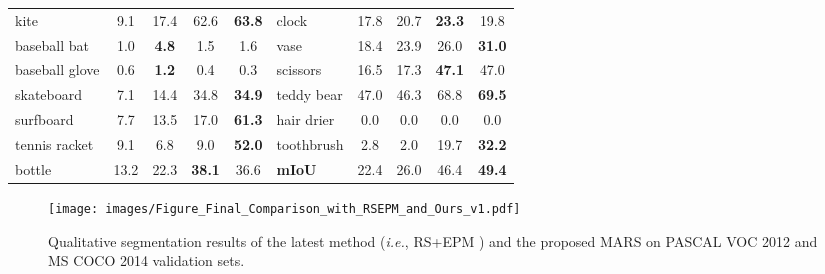 \documentclass[10pt,twocolumn,letterpaper]{article}
\begin{document}
\begin{table*}[t]
\begin{scriptsize}
\begin{tabular}{
    p{} c c c c | p{} c c c c}
    kite & 9.1 & 17.4 & 62.6 & \textbf{63.8} & clock & 17.8 & 20.7 & \textbf{23.3} & 19.8 \\
    baseball bat & 1.0 & \textbf{4.8} & 1.5 & 1.6 & vase & 18.4 & 23.9 & 26.0 & \textbf{31.0} \\
    baseball glove & 0.6 & \textbf{1.2} & 0.4 & 0.3 & scissors & 16.5 & 17.3 & \textbf{47.1} & 47.0 \\
    skateboard & 7.1 & 14.4 & 34.8 & \textbf{34.9} & teddy bear & 47.0 & 46.3 & 68.8 & \textbf{69.5} \\
    surfboard & 7.7 & 13.5 & 17.0 & \textbf{61.3} & hair drier & 0.0 & 0.0 & 0.0 & 0.0 \\
    tennis racket & 9.1 & 6.8 & 9.0 & \textbf{52.0} & toothbrush & 2.8 & 2.0 & 19.7 & \textbf{32.2} \\\cline{6-10}
    bottle & 13.2 & 22.3 & \textbf{38.1} & 36.6 & \textbf{mIoU} & 22.4 & 26.0 & 46.4 & \textbf{49.4} \\
    
    \bottomrule
  \end{tabular}
  \end{scriptsize}
  \label{tab:coco_val_detail}
\end{table*}

\clearpage

\begin{figure*}
  \centering
  \texttt{[image: images/Figure\_Final\_Comparison\_with\_RSEPM\_and\_Ours\_v1.pdf]}
\caption{
      Qualitative segmentation results of the latest method (\emph{i.e.}, RS+EPM \cite{jo2022recurseed}) and the proposed MARS on PASCAL VOC 2012 and MS COCO 2014 validation sets.
  }
  \label{fig:final_wsss}
\end{figure*}
\end{document}

